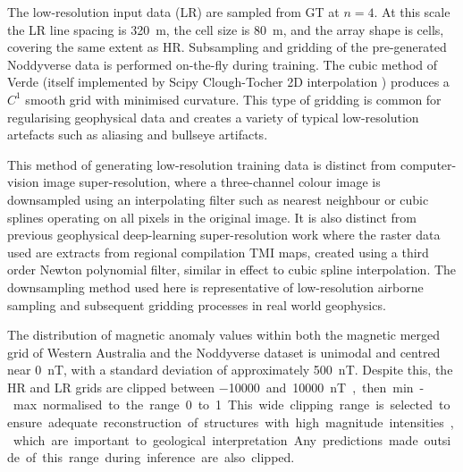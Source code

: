 \documentclass[manuscript.tex]{subfiles}
\begin{document}
The low-resolution input data (LR) are sampled from GT at \(n = 4\).
At this scale the LR line spacing is \qty{320}{\m}, the cell size is \qty{80}{\m}, and the array shape is  cells, covering the same extent as HR\@.
Subsampling and gridding of the pre-generated Noddyverse data is performed on-the-fly during training.
The cubic method of Verde (itself implemented by Scipy Clough-Tocher 2D interpolation \parencite{2020SciPy-NMeth}) produces a \(C^1\) smooth grid with minimised curvature.
This type of gridding is common for regularising geophysical data and creates a variety of typical low-resolution artefacts such as aliasing and bullseye artifacts.

This method of generating low-resolution training data is distinct from computer-vision image super-resolution, where a three-channel colour image is downsampled using an interpolating filter such as nearest neighbour or cubic splines operating on all pixels in the original image.
It is also distinct from previous geophysical deep-learning super-resolution work \textcite{smithMagneticGridResolution2022} where the raster data used are extracts from regional compilation TMI maps, created using a third order Newton polynomial filter, similar in effect to cubic spline interpolation.
The downsampling method used here is representative of low-resolution airborne sampling and subsequent gridding processes in real world geophysics.

The distribution of magnetic anomaly values within both the magnetic merged grid of Western Australia and the Noddyverse dataset is unimodal and centred near \qty{0}{\nano\tesla}, with a standard deviation of approximately \qty{500}{\nano\tesla}.
Despite this, the HR and LR grids are clipped between \qty{-10000} and \qty{10000}{\nano\tesla}, then min-max normalised to the range 0 to 1.
This wide clipping range is selected to ensure adequate reconstruction of structures with high magnitude intensities, which are important to geological interpretation.
Any predictions made outside of this range during inference are also clipped.

\end{document}
